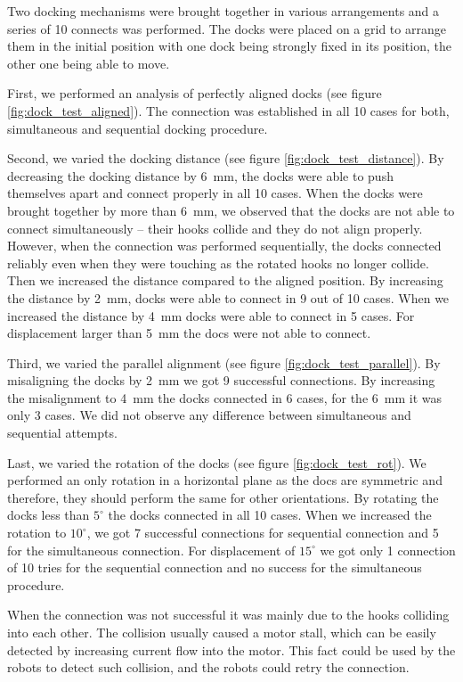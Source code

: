 Two docking mechanisms were brought together in various arrangements and a
series of 10 connects was performed. The docks were placed on a grid to arrange
them in the initial position with one dock being strongly fixed in its position,
the other one being able to move.

First, we performed an analysis of perfectly aligned docks (see figure
\ref{fig:dock_test_aligned}). The connection was established in all 10 cases for
both, simultaneous and sequential docking procedure.

Second, we varied the docking distance (see figure
\ref{fig:dock_test_distance}). By decreasing the docking distance by 6~mm, the
docks were able to push themselves apart and connect properly in all 10 cases.
When the docks were brought together by more than 6~mm, we observed that the
docks are not able to connect simultaneously -- their hooks collide and they do
not align properly. However, when the connection was performed sequentially, the
docks connected reliably even when they were touching as the rotated hooks no
longer collide. Then we increased the distance compared to the aligned position.
By increasing the distance by 2~mm, docks were able to connect in 9 out of 10
cases. When we increased the distance by 4~mm docks were able to connect in 5
cases. For displacement larger than 5~mm the docs were not able to connect.

Third, we varied the parallel alignment (see figure
\ref{fig:dock_test_parallel}). By misaligning the docks by 2~mm we got 9
successful connections. By increasing the misalignment to 4~mm the docks
connected in 6 cases, for the 6~mm it was only 3 cases. We did not observe any
difference between simultaneous and sequential attempts.

Last, we varied the rotation of the docks (see figure \ref{fig:dock_test_rot}).
We performed an only rotation in a horizontal plane as the docs are symmetric
and therefore, they should perform the same for other orientations. By rotating
the docks less than $5^\circ$ the docks connected in all 10 cases. When we
increased the rotation to $10^\circ$, we got 7 successful connections for
sequential connection and 5 for the simultaneous connection. For displacement of
$15^\circ$ we got only 1 connection of 10 tries for the sequential connection
and no success for the simultaneous procedure.

When the connection was not successful it was mainly due to the hooks colliding
into each other. The collision usually caused a motor stall, which can be easily
detected by increasing current flow into the motor. This fact could be used by
the robots to detect such collision, and the robots could retry the connection.

